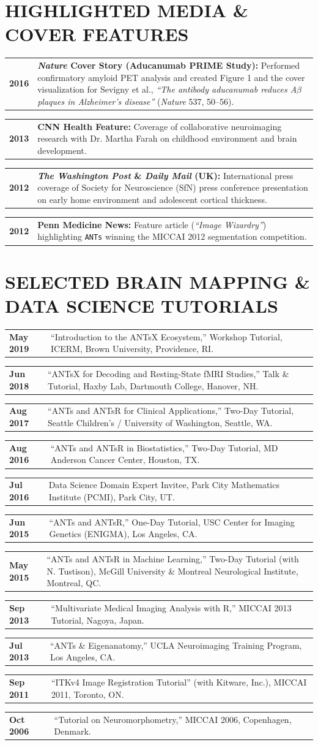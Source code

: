 \documentclass[10pt,letterpaper]{article}
\makeatletter
\newcommand{\cvline}[2]{%
  \noindent\begin{tabularx}{\textwidth}{@{} >{\raggedright\arraybackslash\bfseries\footnotesize\color{accent}}p{1.15in} >{\footnotesize\arraybackslash}X @{}}
    #1 & #2
  \end{tabularx}\par\vspace{2pt}%
}
\makeatother
\begin{document}
\section{HIGHLIGHTED MEDIA \& COVER FEATURES}
\cvline{2016}{\textbf{\textit{Nature} Cover Story (Aducanumab PRIME Study):} Performed confirmatory amyloid PET analysis and created Figure 1 and the cover visualization for Sevigny et al., \textit{``The antibody aducanumab reduces A$\beta$ plaques in Alzheimer's disease''} (\textit{Nature} 537, 50--56).}
\cvline{2013}{\textbf{CNN Health Feature:} Coverage of collaborative neuroimaging research with Dr. Martha Farah on childhood environment and brain development.}
\cvline{2012}{\textbf{\textit{The Washington Post} \& \textit{Daily Mail} (UK):} International press coverage of Society for Neuroscience (SfN) press conference presentation on early home environment and adolescent cortical thickness.}
\cvline{2012}{\textbf{Penn Medicine News:} Feature article (\textit{``Image Wizardry''}) highlighting \texttt{ANTs} winning the MICCAI 2012 segmentation competition.}

\section{SELECTED BRAIN MAPPING \& DATA SCIENCE TUTORIALS}
\cvline{May 2019}{``Introduction to the ANTsX Ecosystem,'' Workshop Tutorial, ICERM, Brown University, Providence, RI.}
\cvline{Jun 2018}{``ANTsX for Decoding and Resting-State fMRI Studies,'' Talk \& Tutorial, Haxby Lab, Dartmouth College, Hanover, NH.}
\cvline{Aug 2017}{``ANTs and ANTsR for Clinical Applications,'' Two-Day Tutorial, Seattle Children's / University of Washington, Seattle, WA.}
\cvline{Aug 2016}{``ANTs and ANTsR in Biostatistics,'' Two-Day Tutorial, MD Anderson Cancer Center, Houston, TX.}
\cvline{Jul 2016}{Data Science Domain Expert Invitee, Park City Mathematics Institute (PCMI), Park City, UT.}
\cvline{Jun 2015}{``ANTs and ANTsR,'' One-Day Tutorial, USC Center for Imaging Genetics (ENIGMA), Los Angeles, CA.}
\cvline{May 2015}{``ANTs and ANTsR in Machine Learning,'' Two-Day Tutorial (with N. Tustison), McGill University \& Montreal Neurological Institute, Montreal, QC.}
\cvline{Sep 2013}{``Multivariate Medical Imaging Analysis with R,'' MICCAI 2013 Tutorial, Nagoya, Japan.}
\cvline{Jul 2013}{``ANTs \& Eigenanatomy,'' UCLA Neuroimaging Training Program, Los Angeles, CA.}
\cvline{Sep 2011}{``ITKv4 Image Registration Tutorial'' (with Kitware, Inc.), MICCAI 2011, Toronto, ON.}
\cvline{Oct 2006}{``Tutorial on Neuromorphometry,'' MICCAI 2006, Copenhagen, Denmark.}
\end{document}
